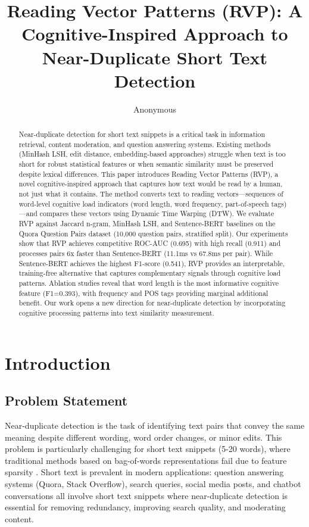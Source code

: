 \documentclass[11pt,letterpaper]{article}
\title{Reading Vector Patterns (RVP): A Cognitive-Inspired Approach to Near-Duplicate Short Text Detection}
\author{Anonymous}
\date{}
\begin{document}
\maketitle

\begin{abstract}
Near-duplicate detection for short text snippets is a critical task in information retrieval, content moderation, and question answering systems. Existing methods (MinHash LSH, edit distance, embedding-based approaches) struggle when text is too short for robust statistical features or when semantic similarity must be preserved despite lexical differences. This paper introduces Reading Vector Patterns (RVP), a novel cognitive-inspired approach that captures how text would be read by a human, not just what it contains. The method converts text to reading vectors---sequences of word-level cognitive load indicators (word length, word frequency, part-of-speech tags)---and compares these vectors using Dynamic Time Warping (DTW). We evaluate RVP against Jaccard n-gram, MinHash LSH, and Sentence-BERT baselines on the Quora Question Pairs dataset (10,000 question pairs, stratified split). Our experiments show that RVP achieves competitive ROC-AUC (0.695) with high recall (0.911) and processes pairs 6x faster than Sentence-BERT (11.1ms vs 67.8ms per pair). While Sentence-BERT achieves the highest F1-score (0.541), RVP provides an interpretable, training-free alternative that captures complementary signals through cognitive load patterns. Ablation studies reveal that word length is the most informative cognitive feature (F1=0.393), with frequency and POS tags providing marginal additional benefit. Our work opens a new direction for near-duplicate detection by incorporating cognitive processing patterns into text similarity measurement.
\end{abstract}

\section{Introduction}

\subsection{Problem Statement}

Near-duplicate detection is the task of identifying text pairs that convey the same meaning despite different wording, word order changes, or minor edits. This problem is particularly challenging for short text snippets (5-20 words), where traditional methods based on bag-of-words representations fail due to feature sparsity \cite{Broder1997}. Short text is prevalent in modern applications: question answering systems (Quora, Stack Overflow), search queries, social media posts, and chatbot conversations all involve short text snippets where near-duplicate detection is essential for removing redundancy, improving search quality, and moderating content.
\end{document}
